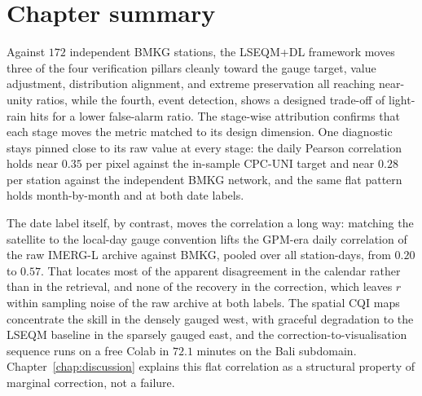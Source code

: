 \section*{Chapter summary}

Against $172$ independent BMKG stations, the LSEQM+DL framework
moves three of the four verification pillars cleanly toward the
gauge target, value adjustment, distribution alignment, and extreme
preservation all reaching near-unity ratios, while the fourth, event
detection, shows a designed trade-off of light-rain hits for a lower
false-alarm ratio. The stage-wise attribution confirms that each
stage moves the metric matched to its design dimension. One
diagnostic stays pinned close to its raw value at every stage: the
daily Pearson correlation holds near $0.35$ per pixel against the
in-sample CPC-UNI target and near $0.28$ per station against the
independent BMKG network, and the same flat pattern holds
month-by-month and at both date labels.

The date label itself,
by contrast, moves the correlation a long way: matching the
satellite to the local-day gauge convention lifts the GPM-era
daily correlation of the raw IMERG-L archive against BMKG, pooled
over all station-days, from $0.20$ to $0.57$. That locates most of
the apparent disagreement in the calendar rather than in the
retrieval, and none of the recovery in the correction, which
leaves $r$ within sampling noise of the raw archive at both
labels. The spatial CQI maps concentrate the skill in the
densely gauged west, with graceful degradation to the LSEQM baseline
in the sparsely gauged east, and the correction-to-visualisation
sequence runs on a free Colab in $72.1$ minutes on the Bali
subdomain.
Chapter~\ref{chap:discussion} explains this flat correlation as a
structural property of marginal correction, not a failure.
